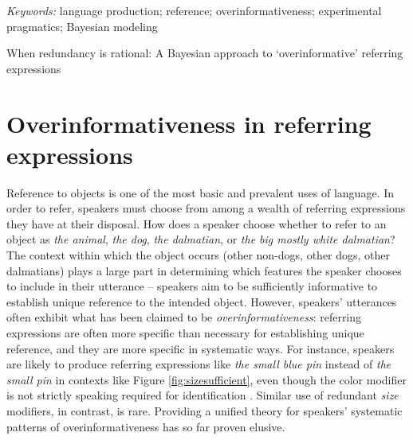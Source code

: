 \documentclass[11pt]{article}
\newcommand{\jd}[1]{\textcolor{Red}{[jd: #1]}}
\newcommand{\ndg}[1]{\textcolor{Green}{[ndg: #1]}}
\newcommand{\figref}[1]{Figure \ref{#1}}
\begin{document}
\emph{Keywords:} language production; reference; overinformativeness; experimental pragmatics; Bayesian modeling


\pagebreak




When redundancy is rational: A Bayesian approach to `overinformative' referring expressions


\section[]{Overinformativeness in referring expressions}
\label{sec:intro}

Reference to objects is one of the most basic and prevalent uses of language. In order to refer, speakers must choose from among a wealth of referring expressions they have at their disposal. How does a speaker choose whether to refer to an object as \emph{the animal}, \emph{the dog}, \emph{the dalmatian}, or \emph{the big mostly white dalmatian}? The context within which the object occurs (other non-dogs, other dogs, other dalmatians) plays a large part in determining which features the speaker chooses to include in their utterance -- speakers aim to be sufficiently informative to establish unique reference to the intended object. However, speakers' utterances often exhibit what has been claimed to be \emph{overinformativeness}: referring expressions are often more specific than necessary for establishing unique reference, and they are more specific in systematic ways. For instance, speakers are likely to produce referring expressions like \emph{the small blue pin} instead of  \emph{the small pin} in contexts like \figref{fig:sizesufficient}, even though the color modifier is not strictly speaking required for identification \cite{gatt2011, Gatt2014, Arts2011, Koolen2011}. Similar use of redundant \emph{size} modifiers, in contrast, is rare. %
Providing a unified theory for speakers' systematic patterns of overinformativeness has so far proven elusive.
\end{document}

